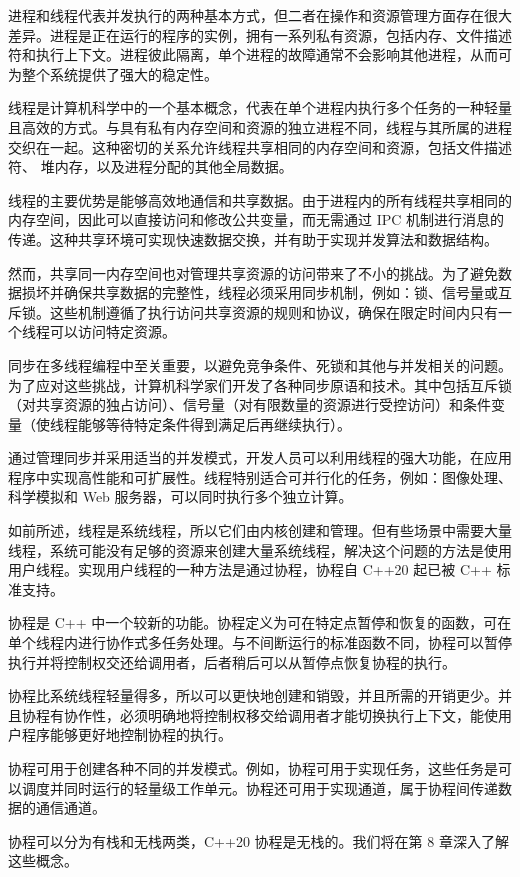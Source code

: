 
进程和线程代表并发执行的两种基本方式，但二者在操作和资源管理方面存在很大差异。进程是正在运行的程序的实例，拥有一系列私有资源，包括内存、文件描述符和执行上下文。进程彼此隔离，单个进程的故障通常不会影响其他进程，从而可为整个系统提供了强大的稳定性。

线程是计算机科学中的一个基本概念，代表在单个进程内执行多个任务的一种轻量且高效的方式。与具有私有内存空间和资源的独立进程不同，线程与其所属的进程交织在一起。这种密切的关系允许线程共享相同的内存空间和资源，包括文件描述符、 堆内存，以及进程分配的其他全局数据。

线程的主要优势是能够高效地通信和共享数据。由于进程内的所有线程共享相同的内存空间，因此可以直接访问和修改公共变量，而无需通过 IPC 机制进行消息的传递。这种共享环境可实现快速数据交换，并有助于实现并发算法和数据结构。

然而，共享同一内存空间也对管理共享资源的访问带来了不小的挑战。为了避免数据损坏并确保共享数据的完整性，线程必须采用同步机制，例如：锁、信号量或互斥锁。这些机制遵循了执行访问共享资源的规则和协议，确保在限定时间内只有一个线程可以访问特定资源。

同步在多线程编程中至关重要，以避免竞争条件、死锁和其他与并发相关的问题。为了应对这些挑战，计算机科学家们开发了各种同步原语和技术。其中包括互斥锁（对共享资源的独占访问）、信号量（对有限数量的资源进行受控访问）和条件变量（使线程能够等待特定条件得到满足后再继续执行）。

通过管理同步并采用适当的并发模式，开发人员可以利用线程的强大功能，在应用程序中实现高性能和可扩展性。线程特别适合可并行化的任务，例如：图像处理、科学模拟和 Web 服务器，可以同时执行多个独立计算。

如前所述，线程是系统线程，所以它们由内核创建和管理。但有些场景中需要大量线程，系统可能没有足够的资源来创建大量系统线程，解决这个问题的方法是使用用户线程。实现用户线程的一种方法是通过协程，协程自 C++20 起已被 C++ 标准支持。

协程是 C++ 中一个较新的功能。协程定义为可在特定点暂停和恢复的函数，可在单个线程内进行协作式多任务处理。与不间断运行的标准函数不同，协程可以暂停执行并将控制权交还给调用者，后者稍后可以从暂停点恢复协程的执行。

协程比系统线程轻量得多，所以可以更快地创建和销毁，并且所需的开销更少。并且协程有协作性，必须明确地将控制权移交给调用者才能切换执行上下文，能使用户程序能够更好地控制协程的执行。

协程可用于创建各种不同的并发模式。例如，协程可用于实现任务，这些任务是可以调度并同时运行的轻量级工作单元。协程还可用于实现通道，属于协程间传递数据的通信通道。

协程可以分为有栈和无栈两类，C++20 协程是无栈的。我们将在第 8 章深入了解这些概念。

